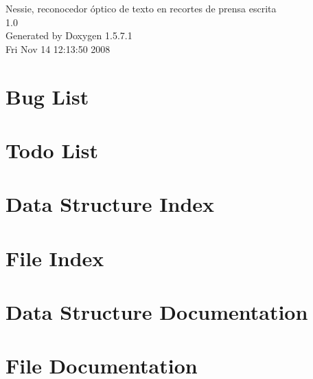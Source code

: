 \documentclass[a4paper]{article}
\begin{document}
\begin{titlepage}
\vspace*{7cm}
\begin{center}
{\Large Nessie, reconocedor óptico de texto en recortes de prensa escrita \\[1ex]\large 1.0 }\\
\vspace*{1cm}
{\large Generated by Doxygen 1.5.7.1}\\
\vspace*{0.5cm}
{\small Fri Nov 14 12:13:50 2008}\\
\end{center}
\end{titlepage}
\tableofcontents
{}
\section{Bug List}
\label{bug}
\hypertarget{bug}{}

\section{Todo List}
\label{todo}
\hypertarget{todo}{}

\section{Data Structure Index}

\section{File Index}

\section{Data Structure Documentation}












\section{File Documentation}

























\printindex
\end{document}
